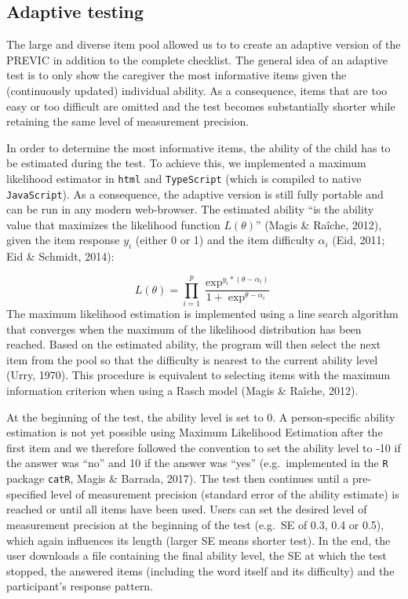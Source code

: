 \documentclass[
  man,floatsintext]{apa6}
\begin{document}
\hypertarget{adaptive-testing}{%
\subsection{Adaptive testing}\label{adaptive-testing}}

The large and diverse item pool allowed us to to create an adaptive version of the PREVIC in addition to the complete checklist. The general idea of an adaptive test is to only show the caregiver the most informative items given the (continuously updated) individual ability. As a consequence, items that are too easy or too difficult are omitted and the test becomes substantially shorter while retaining the same level of measurement precision.

In order to determine the most informative items, the ability of the child has to be estimated during the test. To achieve this, we implemented a maximum likelihood estimator in \texttt{html} and \texttt{TypeScript} (which is compiled to native \texttt{JavaScript}). As a consequence, the adaptive version is still fully portable and can be run in any modern web-browser. The estimated ability ``is the ability value that maximizes the likelihood function \(L(\theta)\)'' (Magis \& Raîche, 2012), given the item response \(y_i\) (either 0 or 1) and the item difficulty \(\alpha_i\) (Eid, 2011; Eid \& Schmidt, 2014):

\[
L(\theta) = \prod_{i = 1}^{p} \frac{\exp^{y_i * (\theta - \alpha_i)}}{1 + \exp^{\theta - \alpha_i}}
\] The maximum likelihood estimation is implemented using a line search algorithm that converges when the maximum of the likelihood distribution has been reached. Based on the estimated ability, the program will then select the next item from the pool so that the difficulty is nearest to the current ability level (Urry, 1970). This procedure is equivalent to selecting items with the maximum information criterion when using a Rasch model (Magis \& Raîche, 2012).

At the beginning of the test, the ability level is set to 0. A person-specific ability estimation is not yet possible using Maximum Likelihood Estimation after the first item and we therefore followed the convention to set the ability level to -10 if the answer was ``no'' and 10 if the answer was ``yes'' (e.g.~implemented in the \texttt{R} package \texttt{catR}, Magis \& Barrada, 2017). The test then continues until a pre-specified level of measurement precision (standard error of the ability estimate) is reached or until all items have been used. Users can set the desired level of measurement precision at the beginning of the test (e.g.~SE of 0.3, 0.4 or 0.5), which again influences its length (larger SE means shorter test). In the end, the user downloads a file containing the final ability level, the SE at which the test stopped, the answered items (including the word itself and its difficulty) and the participant's response pattern.
\end{document}
